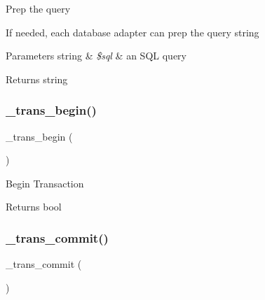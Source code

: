 Prep the query

If needed, each database adapter can prep the query string


\begin{DoxyParams}[1]{Parameters}
string & {\em \$sql} & an S\+QL query \\
\hline
\end{DoxyParams}
\begin{DoxyReturn}{Returns}
string 
\end{DoxyReturn}
\mbox{\label{class_c_i___d_b__mysql__driver_ac81ac882c1d54347d810199a15856aac}} 
\subsubsection{\texorpdfstring{\+\_\+trans\+\_\+begin()}{\_trans\_begin()}}
{\footnotesize\ttfamily \+\_\+trans\+\_\+begin (\begin{DoxyParamCaption}{ }\end{DoxyParamCaption})\hspace{0.3cm}{\ttfamily [protected]}}

Begin Transaction

\begin{DoxyReturn}{Returns}
bool 
\end{DoxyReturn}
\mbox{\label{class_c_i___d_b__mysql__driver_a6fe7f373e0b11cfae23a5f41c0b35dda}} 
\subsubsection{\texorpdfstring{\+\_\+trans\+\_\+commit()}{\_trans\_commit()}}
{\footnotesize\ttfamily \+\_\+trans\+\_\+commit (\begin{DoxyParamCaption}{ }\end{DoxyParamCaption})\hspace{0.3cm}{\ttfamily [protected]}}

